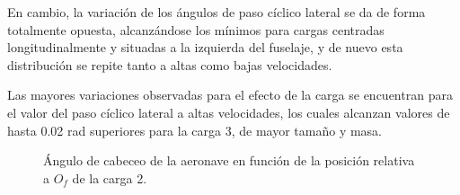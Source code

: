 En cambio, la variación de los ángulos de paso cíclico lateral se da de forma totalmente opuesta, alcanzándose los mínimos para cargas centradas longitudinalmente y situadas a la izquierda del fuselaje, y de nuevo esta distribución se repite tanto a altas como bajas velocidades.

Las mayores variaciones observadas para el efecto de la carga se encuentran para el valor del paso cíclico lateral a altas velocidades, los cuales alcanzan valores de hasta 0.02 rad superiores para la carga 3, de mayor tamaño y masa.

\begin{figure}
	\centering
	\caption{Ángulo de cabeceo de la aeronave en función de la posición relativa a $O_f$ de la carga 2.}
	\label{CabVC2lxy}
\end{figure}
